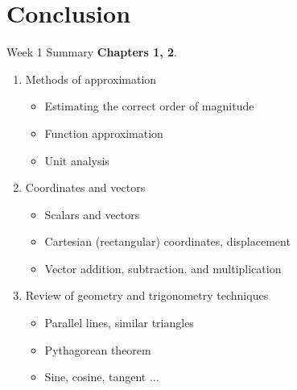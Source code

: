 \documentclass{beamer}
\begin{document}
\section{Conclusion}

\begin{frame}{Week 1 Summary}
\textbf{Chapters 1, 2}.
\begin{enumerate}
\item Methods of approximation
\begin{itemize}
\item \alert{Estimating} the correct order of magnitude
\item \alert{Function} approximation
\item \alert{Unit analysis}
\end{itemize}
\item Coordinates and vectors
\begin{itemize}
\item \alert{Scalars} and \alert{vectors}
\item \alert{Cartesian} (rectangular) coordinates, displacement
\item \alert{Vector} addition, subtraction, and multiplication
\end{itemize}
\item Review of geometry and trigonometry techniques
\begin{itemize}
\item Parallel lines, similar triangles
\item Pythagorean theorem
\item Sine, cosine, tangent ...
\end{itemize}
\end{enumerate}
\end{frame}
\end{document}
